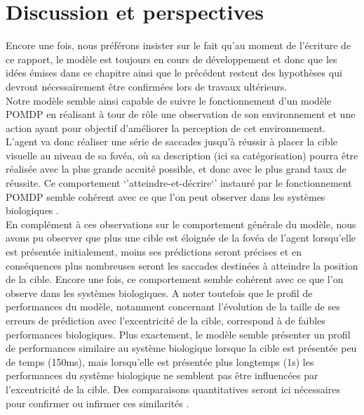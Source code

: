 
\chapter{Discussion et perspectives} %

\label{Discussion} %

Encore une fois, nous préférons insister sur le fait qu'au moment de l'écriture de ce rapport, le modèle est toujours en cours de développement et donc que les idées émises dans ce chapitre ainsi que le précédent restent des hypothèses qui devront nécessairement être confirmées lors de travaux ultérieurs.\\

Notre modèle semble ainsi capable de suivre le fonctionnement d'un modèle POMDP en réalisant à tour de rôle une observation de son environnement et une action ayant pour objectif d'améliorer la perception de cet environnement. \\
L'agent va donc réaliser une série de saccades jusqu'à réussir à placer la cible visuelle au niveau de sa fovéa, où sa description (ici sa catégorisation) pourra être réalisée avec la plus grande accuité possible, et donc avec le plus grand taux de réussite. Ce comportement `'atteindre-et-décrire`' instauré par le fonctionnement POMDP semble cohérent avec ce que l'on peut observer dans les systèmes biologiques \autocite{Werner2014}. \\
En complément à ces observations sur le comportement générale du modèle, nous avons pu observer que plus une cible est éloignée de la fovéa de l'agent lorsqu'elle est présentée initialement, moins ses prédictions seront précises et en conséquences plus nombreuses seront les saccades destinées à atteindre la position de la cible. 
Encore une fois, ce comportement semble cohérent avec ce que l'on observe dans les systèmes biologiques. 
A noter toutefois que le profil de performances du modèle, notamment concernant l'évolution de la taille de ses erreurs de prédiction avec l'excentricité de la cible, correspond à de faibles performances biologiques. 
Plus exactement, le modèle semble présenter un profil de performances similaire au système biologique lorsque la cible est présentée peu de temps (150ms), mais lorsqu'elle est présentée plus longtemps (1s) les performances du système biologique ne semblent pas être influencées par l'excentricité de la cible. Des comparaisons quantitatives seront ici nécessaires pour confirmer ou infirmer ces similarités \autocite{Uddin2004}.\\

